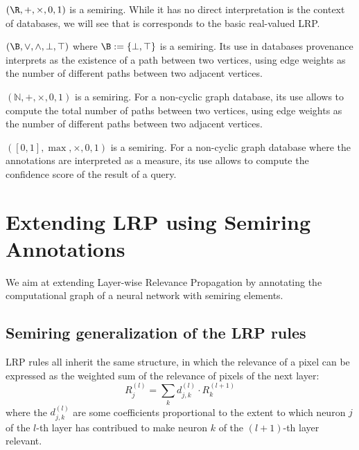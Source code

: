 \documentclass[twocolumn]{../cs-classes/cs-classes}
\newcommand*{\1}{\digitsbb{1}}
\newcommand*{\0}{\digitsbb{0}}
\begin{document}
\begin{example}
    $(\R, +, \times, 0, 1)$ is a semiring. While it has no direct interpretation is the context of databases, we will see that is corresponds to the basic real-valued LRP.
\end{example}

\begin{example}
    $(\B, \lor, \land, \bot, \top)$ where $\B:=\{\bot, \top\}$ is a semiring. Its use in databases provenance interprets as the existence of a path between two vertices, using edge weights as the number of different paths between two adjacent vertices. 
\end{example}

\begin{example}
    $(\mathbb{N}, +, \times, 0, 1)$ is a semiring. For a non-cyclic graph database, its use allows to compute the total number of paths between two vertices, using edge weights as the number of different paths between two adjacent vertices.
\end{example}

\begin{example}
    $([0, 1], \max, \times, 0, 1)$ is a semiring. For a non-cyclic graph database where the annotations are interpreted as a  measure, its use allows to compute the confidence score of the result of a query.
\end{example}

\section{Extending LRP using Semiring Annotations}
We aim at extending Layer-wise Relevance Propagation by annotating the computational graph of a neural network with semiring elements.

\subsection{Semiring generalization of the LRP rules}
LRP rules all inherit the same structure, in which the relevance of a pixel can be expressed as the weighted sum of the relevance of pixels of the next layer:
\begin{equation}
    R_j^{(l)} = \sum_k d_{j, k}^{(l)} \cdot R_k^{(l+1)}
    \label{eq:general-lrp}
\end{equation}
where the $d_{j,k}^{(l)}$ are some coefficients proportional to the extent to which neuron $j$ of the $l$-th layer has contribued to make neuron $k$ of the $(l+1)$-th layer relevant.
\end{document}
